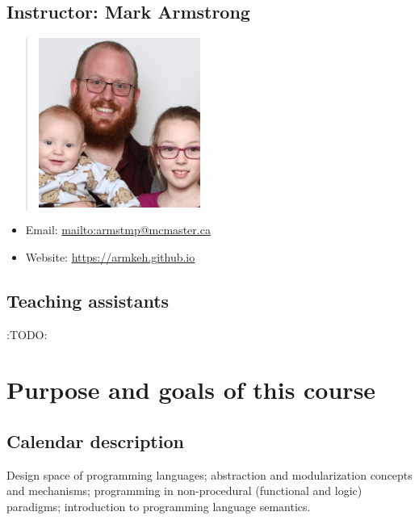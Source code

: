 \documentclass[11pt]{article}
\theoremstyle{definition}
\begin{document}
\subsection{Instructor: Mark Armstrong}
\label{sec:orgc2ed85e}
\begin{quote}
\includegraphics[width=200px]{./media/markarmstrong.jpg}
\end{quote}

\begin{itemize}
\item Email: \url{mailto:armstmp@mcmaster.ca}
\item Website: \url{https://armkeh.github.io}
\end{itemize}

\subsection{Teaching assistants}
\label{sec:org4cb5b42}
:TODO:

\section{Purpose and goals of this course}
\label{sec:org180a47b}
\subsection{Calendar description}
\label{sec:orgd3e33b0}
Design space of programming languages;
abstraction and modularization concepts and mechanisms;
programming in non-procedural (functional and logic) paradigms;
introduction to programming language semantics.
\end{document}
